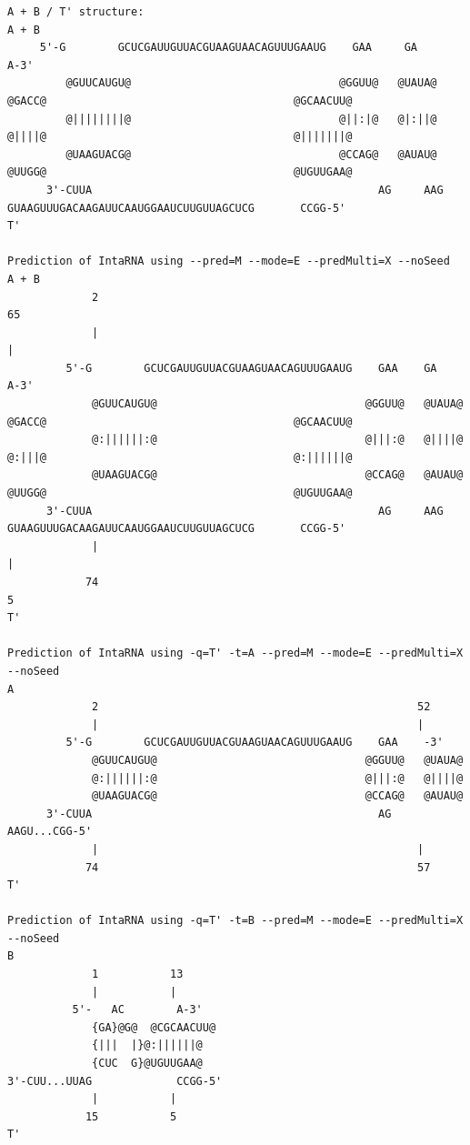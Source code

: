 \documentclass[11pt,a4paper]{report}
\begin{document}
\newpage
\begin{landscape}
\begin{lstlisting}[style=base]
A + B / T' structure:
A + B
	 5'-G        GCUCGAUUGUUACGUAAGUAACAGUUUGAAUG    GAA     GA                                                 A-3'
	     @GUUCAUGU@                                @GGUU@   @UAUA@   @GACC@                                      @GCAACUU@ 
	     @||||||||@                                @||:|@   @|:||@   @||||@                                      @|||||||@
	     @UAAGUACG@                                @CCAG@   @AUAU@   @UUGG@                                      @UGUUGAA@
      3'-CUUA                                            AG     AAG    GUAAGUUUGACAAGAUUCAAUGGAAUCUUGUUAGCUCG       CCGG-5'
T'

Prediction of IntaRNA using --pred=M --mode=E --predMulti=X --noSeed
A + B
             2                                                                                                     65
             |                                                                                                     |
         5'-G        GCUCGAUUGUUACGUAAGUAACAGUUUGAAUG    GAA    GA                                                  A-3'
             @GUUCAUGU@                                @GGUU@   @UAUA@   @GACC@                                      @GCAACUU@
             @:||||||:@                                @|||:@   @||||@   @:|||@                                      @:||||||@
             @UAAGUACG@                                @CCAG@   @AUAU@   @UUGG@                                      @UGUUGAA@
      3'-CUUA                                            AG     AAG    GUAAGUUUGACAAGAUUCAAUGGAAUCUUGUUAGCUCG       CCGG-5'
             |                                                                                                     |
            74                                                                                                     5
T'

Prediction of IntaRNA using -q=T' -t=A --pred=M --mode=E --predMulti=X --noSeed
A
             2                                                 52
             |                                                 |
         5'-G        GCUCGAUUGUUACGUAAGUAACAGUUUGAAUG    GAA    -3'
             @GUUCAUGU@                                @GGUU@   @UAUA@
             @:||||||:@                                @|||:@   @||||@
             @UAAGUACG@                                @CCAG@   @AUAU@
      3'-CUUA                                            AG     AAGU...CGG-5'
             |                                                 |
            74                                                 57
T'

Prediction of IntaRNA using -q=T' -t=B --pred=M --mode=E --predMulti=X --noSeed
B
             1           13
             |           |
          5'-   AC        A-3'
             {GA}@G@  @CGCAACUU@
             {|||  |}@:||||||@
             {CUC  G}@UGUUGAA@
3'-CUU...UUAG             CCGG-5'
             |           |
            15           5
T'

\end{lstlisting}
\label{Result:mirror}
\end{landscape}
\end{document}
